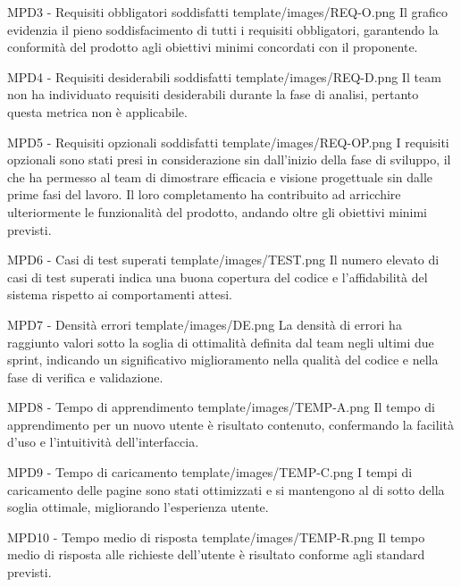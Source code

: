 \MetNoPB
{ %
    MPD3 - Requisiti obbligatori soddisfatti     
}
{ %
    template/images/REQ-O.png
}
{   %
    Il grafico evidenzia il pieno soddisfacimento di tutti i requisiti obbligatori, garantendo la conformità del prodotto agli obiettivi minimi concordati con il proponente.
}

\MetNoPB
{ %
    MPD4 - Requisiti desiderabili soddisfatti    
}
{ %
    template/images/REQ-D.png
}
{   %
    Il team non ha individuato requisiti desiderabili durante la fase di analisi, pertanto questa metrica non è applicabile.
}

\MetNoPB
{ %
    MPD5 - Requisiti opzionali soddisfatti    
}
{ %
    template/images/REQ-OP.png
}
{   %
I requisiti opzionali sono stati presi in considerazione sin dall'inizio della fase di sviluppo, il che ha permesso al team di dimostrare efficacia e visione progettuale sin dalle prime fasi del lavoro. Il loro completamento ha contribuito ad arricchire ulteriormente le funzionalità del prodotto, andando oltre gli obiettivi minimi previsti.
}

\MetNoPB
{ %
    MPD6 - Casi di test superati     
}
{ %
    template/images/TEST.png
}
{   %
    Il numero elevato di casi di test superati indica una buona copertura del codice e l’affidabilità del sistema rispetto ai comportamenti attesi.
}

\MetNoPB
{ %
    MPD7 - Densità errori
}
{ %
    template/images/DE.png
}
{   %
La densità di errori ha raggiunto valori sotto la soglia di ottimalità definita dal team negli ultimi due sprint, indicando un significativo miglioramento nella qualità del codice e nella fase di verifica e validazione.
}

\MetNoPB
{ %
    MPD8 - Tempo di apprendimento    
}
{ %
    template/images/TEMP-A.png
}
{   %
    Il tempo di apprendimento per un nuovo utente è risultato contenuto, confermando la facilità d’uso e l’intuitività dell’interfaccia.
}

\MetNoPB
{ %
    MPD9 - Tempo di caricamento    
}
{ %
    template/images/TEMP-C.png
}
{   %
    I tempi di caricamento delle pagine sono stati ottimizzati e si mantengono al di sotto della soglia ottimale, migliorando l’esperienza utente.
}

\MetNoPB
{ %
    MPD10 - Tempo medio di risposta    
}
{ %
    template/images/TEMP-R.png
}
{   %
    Il tempo medio di risposta alle richieste dell’utente è risultato conforme agli standard previsti.
}

